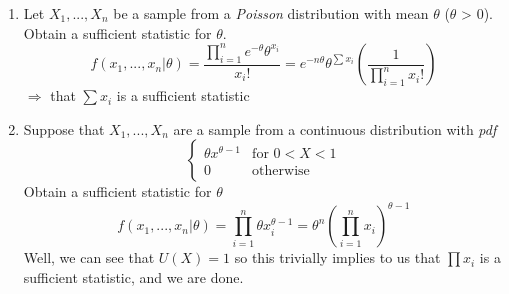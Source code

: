 \documentclass{article}
\begin{document}
\begin{enumerate}
    \item Let $X_1,...,X_n$ be a sample from a \textit{Poisson} distribution with mean $\theta$ ($\theta$ > 0). Obtain a sufficient statistic for $\theta$.
    \begin{equation*}
        f(x_1,...,x_n|\theta) = \frac{\prod_{i=1}^n e^{-\theta} \theta^{x_i}}{x_i!} = e^{-n\theta}\theta^{\sum x_i}\left(\frac{1}{\prod_{i=1}^n x_i!} \right)
    \end{equation*}
    $\Rightarrow$ that $\sum x_i$ is a sufficient statistic

    \item Suppose that $X_1,...,X_n$ are a sample from a continuous distribution with \textit{pdf}
    \begin{equation*}
        \begin{cases}
            \theta x^{\theta-1} & \text{for } 0<X<1\\
            0 & \text{otherwise}
        \end{cases}
    \end{equation*}
    Obtain a sufficient statistic for $\theta$
    \begin{equation*}
        f(x_1,...,x_n|\theta) = \prod_{i=1}^n \theta x_i^{\theta-1} = \theta^n\left(\prod_{i=1}^n x_i \right)^{\theta-1}
    \end{equation*}
    Well, we can see that $U(X) = 1$ so this trivially implies to us that $\prod x_i$ is a sufficient statistic, and we are done.


\end{enumerate}
\end{document}

